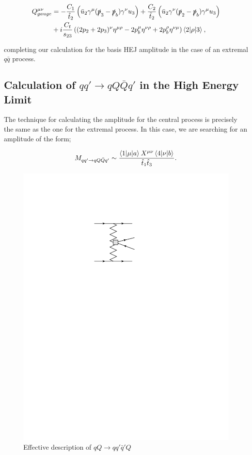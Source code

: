 \begin{equation}
\begin{split}
Q^{\mu \nu}_{gauge} &= -\frac{C_1}{\hat{t}_2} \left(\bar{u}_2 \gamma^\mu (\slashed{p}_3-\slashed{p}_b)\gamma^\nu u_3 \right) + \frac{C_2}{\tilde{t}_2} \left( \bar{u}_2 \gamma^\nu (\slashed{p}_2-\slashed{p}_b) \gamma^\mu u_3 \right)  \\
&+ i  \frac{C_t}{s_{23}} \left((2p_2+2p_3)^\nu \eta^{\mu \rho} - 2p_b^\mu \eta^{\nu \rho} + 2p_b^\rho \eta^{\nu \mu} \right) \mathinner{\langle2\vert\rho\vert3\rangle}_{},
\end{split}
\end{equation}

completing our calculation for the basis HEJ amplitude in the case of an extremal $q \bar{q}$ process.

\subsection{Calculation of $qq' \to qQ\bar{Q}q'$ in the High Energy Limit}

The technique for calculating the amplitude for the central process is precisely the same as the one for the extremal process. In this case, we are searching for an amplitude of the form;

\begin{equation}
M_{qq' \to qQ\bar{Q}q'} \sim \frac{\mathinner{\langle1\vert\mu\vert a\rangle}_{}X^{\mu \nu} \mathinner{\langle4\vert\nu\vert b\rangle}_{}}{\hat{t}_1 \hat{t}_3}.
\end{equation}

\begin{figure}[t]
\centering
\includegraphics{Images/qq_qqqq_eff.pdf}
\caption{Effective description of $qQ \to qq'\bar{q}' Q$}
\end{figure}

